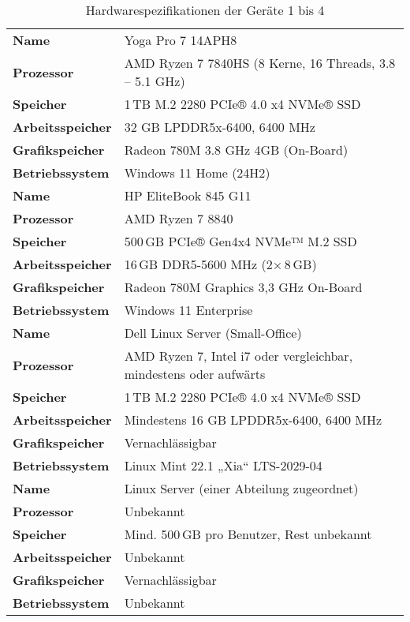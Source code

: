 \begin{table}[htbp]
  \centering
  \footnotesize %
  \caption{Hardwarespezifikationen der Geräte 1 bis 4}
  \renewcommand{\arraystretch}{1.2}
  \begin{tabularx}{\textwidth}{l X}
  \toprule
  \textbf{Name} & Yoga Pro 7 14APH8 \\ 
  \textbf{Prozessor} & AMD Ryzen 7 7840HS (8 Kerne, 16 Threads, 3.8 -- 5.1 GHz) \\
  \textbf{Speicher} & 1 TB M.2 2280 PCIe® 4.0 x4 NVMe® SSD \\
  \textbf{Arbeitsspeicher} & 32 GB LPDDR5x-6400, 6400 MHz \\
  \textbf{Grafikspeicher} & Radeon 780M 3.8 GHz 4GB (On-Board) \\
  \textbf{Betriebssystem} & Windows 11 Home (24H2) \\
  \midrule
  \textbf{Name} & HP EliteBook 845 G11\\
  \textbf{Prozessor} & AMD Ryzen 7 8840\\
  \textbf{Speicher} & 500 GB PCIe® Gen4x4 NVMe™ M.2 SSD\\
  \textbf{Arbeitsspeicher} & 16 GB DDR5-5600 MHz (2× 8 GB)\\
  \textbf{Grafikspeicher} & Radeon 780M Graphics 3,3 GHz On-Board\\
  \textbf{Betriebssystem} & Windows 11 Enterprise\\
  \midrule
  \textbf{Name} & Dell Linux Server (Small-Office) \\
  \textbf{Prozessor} & AMD Ryzen 7, Intel i7 oder vergleichbar, mindestens oder aufwärts \\
  \textbf{Speicher} & 1 TB M.2 2280 PCIe® 4.0 x4 NVMe® SSD \\
  \textbf{Arbeitsspeicher} & Mindestens 16 GB LPDDR5x-6400, 6400 MHz \\
  \textbf{Grafikspeicher} & Vernachlässigbar \\
  \textbf{Betriebssystem} & Linux Mint 22.1 „Xia“ LTS-2029-04 \\
  \midrule
  \textbf{Name} & Linux Server (einer Abteilung zugeordnet) \\
  \textbf{Prozessor} & Unbekannt \\
  \textbf{Speicher} & Mind. 500 GB pro Benutzer, Rest unbekannt \\
  \textbf{Arbeitsspeicher} & Unbekannt \\
  \textbf{Grafikspeicher} & Vernachlässigbar \\
  \textbf{Betriebssystem} & Unbekannt \\
  \bottomrule
  \end{tabularx}
\end{table}
